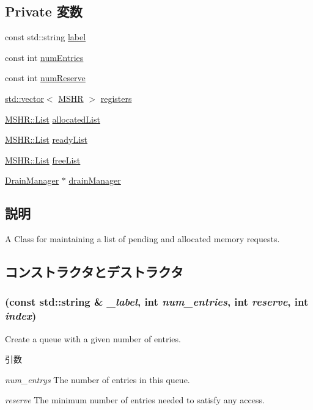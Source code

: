 \subsection*{Private 変数}
\begin{DoxyCompactItemize}
\item 
const std::string \hyperlink{classMSHRQueue_ae471a4c4073716b769170188214fe93d}{label}
\item 
const int \hyperlink{classMSHRQueue_aac2a0fada965c3dd6220aeb40a28c587}{numEntries}
\item 
const int \hyperlink{classMSHRQueue_a2c97f85062902d3990c3a9c163306547}{numReserve}
\item 
\hyperlink{classstd_1_1vector}{std::vector}$<$ \hyperlink{classMSHR}{MSHR} $>$ \hyperlink{classMSHRQueue_a61e75efe923d1fa4bbb72f426a219b7e}{registers}
\item 
\hyperlink{classstd_1_1list}{MSHR::List} \hyperlink{classMSHRQueue_a4bac1d00b2059c983d4afaf4df82f4ac}{allocatedList}
\item 
\hyperlink{classstd_1_1list}{MSHR::List} \hyperlink{classMSHRQueue_ab090e7fb494c0f9af81d19d1959684a0}{readyList}
\item 
\hyperlink{classstd_1_1list}{MSHR::List} \hyperlink{classMSHRQueue_abad3c0dea35aa5b18c234af72cd8ac89}{freeList}
\item 
\hyperlink{classDrainManager}{DrainManager} $\ast$ \hyperlink{classMSHRQueue_a329b71fb934a93312ca0aacbf5a3f982}{drainManager}
\end{DoxyCompactItemize}


\subsection{説明}
A Class for maintaining a list of pending and allocated memory requests. 

\subsection{コンストラクタとデストラクタ}
\hypertarget{classMSHRQueue_a72708efb7b001e844259a19264e0f275}{
\subsubsection[{MSHRQueue}]{ (const std::string \& {\em \_\-label}, \/  int {\em num\_\-entries}, \/  int {\em reserve}, \/  int {\em index})}}
\label{classMSHRQueue_a72708efb7b001e844259a19264e0f275}
Create a queue with a given number of entries. 
\begin{DoxyParams}{引数}
\item[{\em num\_\-entrys}]The number of entries in this queue. \item[{\em reserve}]The minimum number of entries needed to satisfy any access. \end{DoxyParams}



